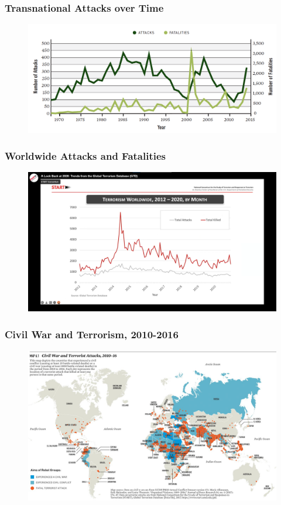 \documentclass[handout]{beamer}
\begin{document}
\begin{frame} 
\frametitle{\LARGE{Transnational Attacks over Time}}
\begin{figure}[ht!]
	\centering
	\includegraphics[width=\textwidth,height=0.8\textheight,keepaspectratio]{./trans_attacks.png}
\end{figure}
\end{frame}

\begin{frame} 
	\frametitle{\LARGE{Worldwide Attacks and Fatalities}}
	\begin{figure}[ht!]
		\centering
		\includegraphics[width=\textwidth,height=\textheight,keepaspectratio]{terrorism2012.png}
	\end{figure}
\end{frame}

\begin{frame} 
	\frametitle{\LARGE{Civil War and Terrorism, 2010-2016}}
	\begin{figure}[ht!]
		\centering
		\includegraphics[width=\textwidth,height=0.8\textheight,keepaspectratio]{civwarter.jpg}
	\end{figure}
\end{frame}
\end{document}
